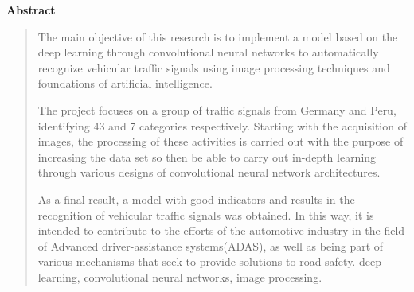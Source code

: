   \newpage
  \begin{center}
   {\bf\LARGE Abstract}\vskip 1.5cm
  \end{center} 
  \begin{quotation}

  The main objective of this research is to implement a model based on the deep learning through convolutional neural networks to automatically recognize vehicular traffic signals using image processing techniques and foundations of artificial intelligence.
  \vskip 0.2cm
  
  The project focuses on a group of traffic signals from Germany and Peru, identifying 43 and 7 categories respectively. Starting with the acquisition of images, the processing of these activities is carried out with the purpose of increasing the data set so then be able to carry out in-depth learning through various designs of convolutional neural network architectures.
  \vskip 0.2cm

  As a final result, a model with good indicators and results in the recognition of vehicular traffic signals was obtained. In this way, it is intended to contribute to the efforts of the automotive industry in the field of Advanced driver-assistance systems(ADAS), as well as being part of various mechanisms that seek to provide solutions to road safety.
  \vskip 0.3cm
  \hspace*{-0.6cm}{\bf Keywords:} deep learning, convolutional neural networks, image processing.
  \end {quotation}



